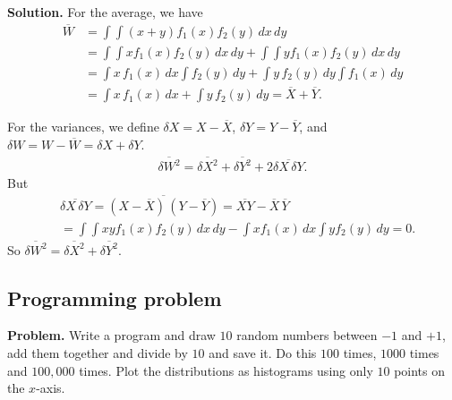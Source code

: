 \documentclass[twocolumn, 10pt]{article}
\numberwithin{equation}{section}
\newenvironment{problem}
{\par\medskip\sffamily \color{problue}
  \textbf{Problem. }\ignorespaces}
{\medskip}
\newenvironment{solution}
{\par\medskip
  \textbf{Solution. }\ignorespaces}
{\medskip}
\begin{document}
\begin{solution}
  For the average, we have
  \begin{align*}
    \overline W
    &=
    \int \int (x + y) f_1(x) f_2(y) \, dx \, dy
    \\
    &=
    \int \int x f_1(x) f_2(y) \, dx \, dy
    +
    \int \int y f_1(x) f_2(y) \, dx \, dy
    \\
    &=
    \int x \, f_1(x) \, dx \int f_2(y) \, dy
    +
    \int y \, f_2(y) \, dy \int f_1(x) \, dy
    \\
    &=
    \int x \, f_1(x) \, dx
    +
    \int y \, f_2(y) \, dy
    =
    \overline X + \overline Y.
  \end{align*}

  For the variances,
  we define
  $\delta X = X - \overline X$,
  $\delta Y = Y - \overline Y$,
  and
  $\delta W = W - \overline W = \delta X + \delta Y$.
  \begin{align*}
    \overline{ \delta W^2 }
    =
    \overline{ \delta X^2 }
    +
    \overline{ \delta Y^2 }
    +
    2 \overline{ \delta X \, \delta Y }.
  \end{align*}
  But
  \begin{align*}
    &\overline{ \delta X \, \delta Y }
    =
    \overline{ (X - \overline X) \, (Y - \overline Y) }
    =
    \overline{ X Y }
    - \overline X \, \overline Y
    \\
    &=
    \int \int x y f_1(x) f_2(y) \, dx \, dy
    -
    \int x f_1(x) \, dx \int y f_2(y) \, dy
    = 0.
  \end{align*}
  So
    $\overline{ \delta W^2 }
    =
    \overline{ \delta X^2 }
    +
    \overline{ \delta Y^2 }$.
\end{solution}

\subsection{Programming problem}

\begin{problem}
Write a program and draw $10$ random numbers between $-1$ and $+1$,
add them together and divide by $10$ and save it.
Do this $100$ times, $1000$ times and $100,000$ times.
Plot the distributions as histograms using only $10$ points on the $x$-axis.
\end{problem}
\end{document}
